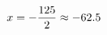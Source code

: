 \documentclass[preview]{standalone}
\begin{document}
\begin{align*}
\special{dvisvgm:raw <g id='unique000'>}x = - \frac{125}{2} \approx -62.5\special{dvisvgm:raw </g>}
\end{align*}
\end{document}
